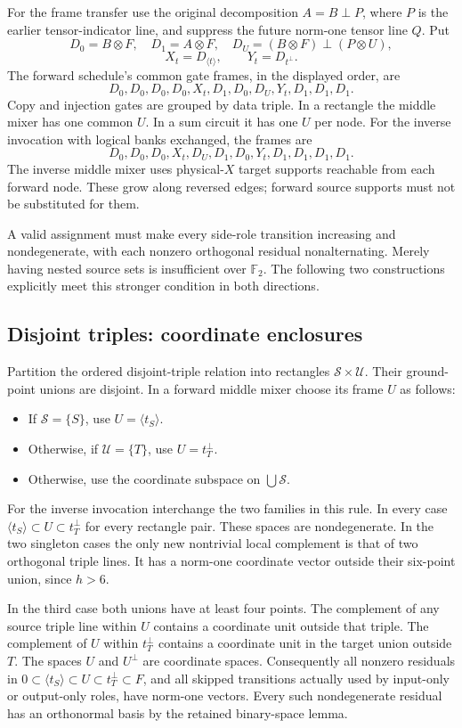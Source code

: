 For the frame transfer use the original decomposition $A=B\perp P$,
where $P$ is the earlier tensor-indicator line, and suppress the future
norm-one tensor line $Q$. Put
\[
 D_0=B\otimes F,\quad D_1=A\otimes F,\quad
 D_U=(B\otimes F)\perp(P\otimes U),
\]
\[
 X_t=D_{\langle t\rangle},\qquad Y_t=D_{t^\perp}.
\]
The forward schedule's common gate frames, in the displayed order, are
\[
 D_0,D_0,D_0,D_0,X_t,D_1,D_0,D_U,Y_t,D_1,D_1,D_1.
\]
Copy and injection gates are grouped by data triple. In a rectangle the
middle mixer has one common $U$. In a sum circuit it has one $U$ per node.
For the inverse invocation with logical banks exchanged, the frames are
\[
 D_0,D_0,D_0,X_t,D_U,D_1,D_0,Y_t,D_1,D_1,D_1,D_1.
\]
The inverse middle mixer uses physical-$X$ target supports reachable from
each forward node. These grow along reversed edges; forward source supports
must not be substituted for them.

A valid assignment must make every side-role transition increasing and
nondegenerate, with each nonzero orthogonal residual nonalternating. Merely
having nested source sets is insufficient over $\mathbb F_2$. The following
two constructions explicitly meet this stronger condition in both directions.

\subsection{Disjoint triples: coordinate enclosures}
Partition the ordered disjoint-triple relation into rectangles
$\mathcal S\times\mathcal U$. Their ground-point unions are disjoint.
In a forward middle mixer choose its frame $U$ as follows:
\begin{itemize}
\item If $\mathcal S=\{S\}$, use $U=\langle t_S\rangle$.
\item Otherwise, if $\mathcal U=\{T\}$, use $U=t_T^\perp$.
\item Otherwise, use the coordinate subspace on $\bigcup\mathcal S$.
\end{itemize}
For the inverse invocation interchange the two families in this rule.
In every case $\langle t_S\rangle\subset U\subset t_T^\perp$ for
every rectangle pair. These spaces are nondegenerate. In the two singleton
cases the only new nontrivial local complement is that of two orthogonal
triple lines. It has a norm-one coordinate vector outside their six-point
union, since $h>6$.

In the third case both unions have at least four points. The complement
of any source triple line within $U$ contains a coordinate unit outside
that triple. The complement of $U$ within $t_T^\perp$ contains a coordinate
unit in the target union outside $T$. The spaces $U$ and $U^\perp$ are
coordinate spaces. Consequently all nonzero residuals in
$0\subset\langle t_S\rangle\subset U\subset t_T^\perp\subset F$,
and all skipped transitions actually used by input-only or output-only
roles, have norm-one vectors. Every such nondegenerate residual has an
orthonormal basis by the retained binary-space lemma.

